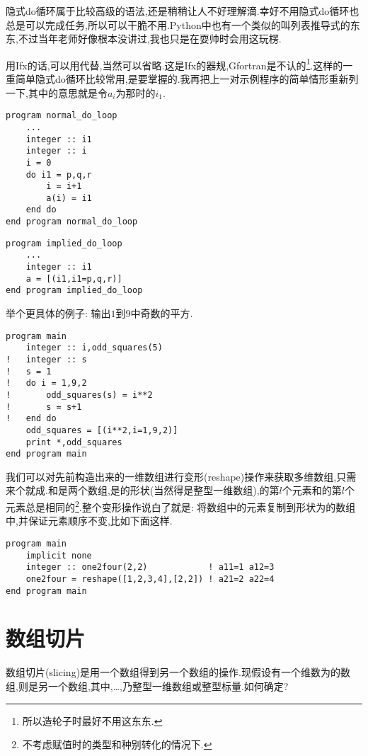 隐式do循环属于比较高级的语法,还是稍稍让人不好理解滴.幸好不用隐式do循环也总是可以完成任务,所以可以干脆不用.Python中也有一个类似的叫列表推导式的东东,不过当年老师好像根本没讲过,我也只是在耍帅时会用这玩楞.

用Ifx的话,可以用代替,当然可以省略.这是Ifx的器规,Gfortran是不认的\footnote{
所以造轮子时最好不用这东东.
}.这样的一重简单隐式do循环比较常用,是要掌握的.我再把上一对示例程序的简单情形重新列一下,其中的意思就是令$a_i$为那时的$i_1$.
\begin{lstlisting}
program normal_do_loop
    ...
    integer :: i1
    integer :: i
    i = 0
    do i1 = p,q,r
        i = i+1
        a(i) = i1
    end do
end program normal_do_loop
\end{lstlisting}
\begin{lstlisting}
program implied_do_loop
    ...
    integer :: i1
    a = [(i1,i1=p,q,r)]
end program implied_do_loop
\end{lstlisting}
举个更具体的例子: 输出$1$到$9$中奇数的平方.
\begin{lstlisting}
program main
    integer :: i,odd_squares(5)
!   integer :: s
!   s = 1
!   do i = 1,9,2
!       odd_squares(s) = i**2
!       s = s+1
!   end do
    odd_squares = [(i**2,i=1,9,2)]
    print *,odd_squares
end program main
\end{lstlisting}

我们可以对先前构造出来的一维数组进行变形(reshape)操作来获取多维数组,只需来个就成.和是两个数组,是的形状(当然得是整型一维数组),的第$l$个元素和的第$l$个元素总是相同的\footnote{
不考虑赋值时的类型和种别转化的情况下.
}.整个变形操作说白了就是: 将数组中的元素复制到形状为的数组中,并保证元素顺序不变,比如下面这样.
\begin{lstlisting}
program main
    implicit none
    integer :: one2four(2,2)            ! a11=1 a12=3
    one2four = reshape([1,2,3,4],[2,2]) ! a21=2 a22=4
end program main
\end{lstlisting}

\section{数组切片}

数组切片(slicing)是用一个数组得到另一个数组的操作.现假设有一个维数为的数组,则是另一个数组,其中,\dots,乃整型一维数组或整型标量.如何确定?

